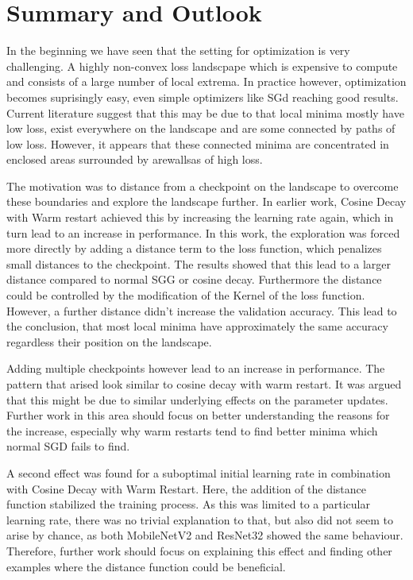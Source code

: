 \chapter{Summary and Outlook}

In the beginning we have seen that the setting for optimization is very
challenging. A highly non-convex loss landscpape which is expensive to compute
and consists of a large number of local extrema. In practice however,
optimization becomes suprisingly easy, even simple optimizers like SGd reaching
good results. Current literature suggest that this may be due to that local
minima mostly have low loss, exist everywhere on the landscape and are some
connected by paths of low loss. However, it appears that these connected minima are
concentrated in enclosed areas surrounded by arewallsas of high loss.

The motivation was to distance from a checkpoint on the landscape to overcome
these boundaries and explore the landscape further. In earlier work, Cosine
Decay with Warm restart achieved this by increasing the learning rate again,
which in turn lead to an increase in performance. In this work, the exploration
was forced more directly by adding a distance term to the loss function, which
penalizes small distances to the checkpoint. The results showed that this lead
to a larger distance compared to normal SGG or cosine decay. Furthermore the
distance could be controlled by the modification of the Kernel of the loss
function. However, a further distance didn't increase the validation accuracy.
This lead to the conclusion, that most local minima have approximately the same
accuracy regardless their position on the landscape.

Adding multiple checkpoints however lead to an increase in performance. The
pattern that arised look similar to cosine decay with warm restart. It was
argued that this might be due to similar underlying effects on the parameter
updates. Further work in this area should focus on better understanding the
reasons for the increase, especially why warm restarts tend to find better
minima which normal SGD fails to find.

A second effect was found for a suboptimal initial learning rate in combination
with Cosine Decay with Warm Restart. Here, the addition of the distance function
stabilized the training process. As this was limited to a particular learning
rate, there was no trivial explanation to that, but also did not seem to arise
by chance, as both MobileNetV2 and ResNet32 showed the same behaviour.
Therefore, further work should focus on explaining this effect and finding other
examples where the distance function could be beneficial.

